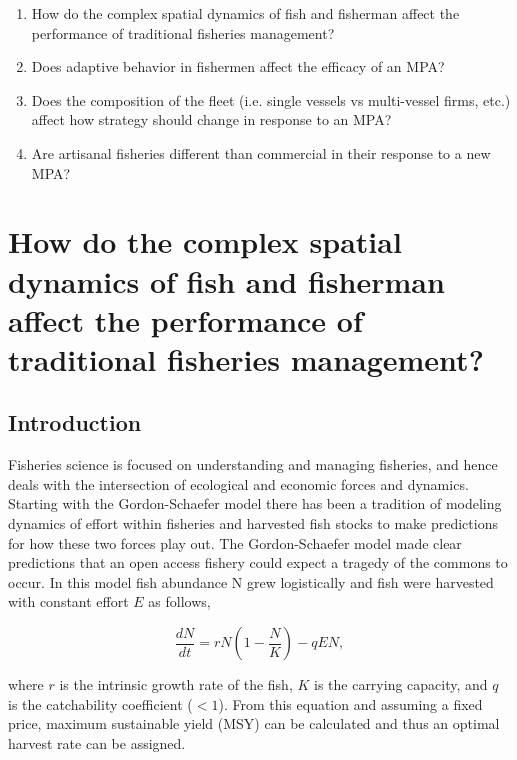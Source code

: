 \documentclass[12pt,a4paper]{report}
\begin{document}
\begin{enumerate}
\item How do the complex spatial dynamics of fish and fisherman affect the performance of traditional fisheries management?
\item Does adaptive behavior in fishermen affect the efficacy of an MPA?
\item Does the composition of the fleet (i.e. single vessels vs multi-vessel firms, etc.) affect how strategy should change in response to an MPA?
\item Are artisanal fisheries different than commercial in their response to a new MPA?
\end{enumerate}

\section{How do the complex spatial dynamics of fish and fisherman affect the performance of traditional fisheries management?}
\subsection{Introduction}
Fisheries science is focused on understanding and managing fisheries, and hence deals with the intersection of ecological and economic forces and dynamics. Starting with the Gordon-Schaefer model \citep{Schaefer:1954} there has been a tradition of modeling dynamics of effort within fisheries and harvested fish stocks to make predictions for how these two forces play out. The Gordon-Schaefer model made clear predictions that an open access fishery could expect a tragedy of the commons to occur. In this model fish abundance N grew logistically and fish were harvested with constant effort $E$ as follows,

\begin{equation}
\frac{dN}{dt} = rN\left(1-\frac{N}{K}\right)-qEN,
\end{equation}

\noindent where $r$ is the intrinsic growth rate of the fish, $K$ is the carrying capacity, and $q$ is the catchability coefficient ($< 1$). From this equation and assuming a fixed price, maximum sustainable yield (MSY) can be calculated and thus an optimal harvest rate can be assigned. 
\end{document}
